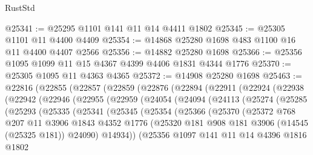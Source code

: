 \begin{lexlean}{RustStd}
\begin{coremodule}
@25341 := @25295 @1101 @141 @11 @14 @4411 @1802
@25345 := @25305 @1101 @11 @4400 @4409
@25354 := @14868 @25280 @1698 @483 @1100 @16 @11 @4400 @4407 @2566
@25356 := @14882 @25280 @1698
@25366 := @25356 @1095 @1099 @11 @15 @4367 @4399 @4406 @1831 @4344 @1776
@25370 := @25305 @1095 @11 @4363 @4365
@25372 := @14908 @25280 @1698
@25463 := @22816
    (@22855
      (@22857
        (@22859
          (@22876
            (@22894
              (@22911
                (@22924
                  (@22938
                    (@22942
                      (@22946
                        (@22955
                          (@22959
                            (@24054
                              (@24094
                                (@24113
                                  (@25274
                                    (@25285
                                      (@25293
                                        (@25335
                                          (@25341
                                            (@25345
                                              (@25354
                                                (@25366
                                                  (@25370
                                                    (@25372
                                                      @768
                                                      @207
                                                      @11
                                                      @3906
                                                      @1843
                                                      @4352
                                                      @1776
                                                      (@25320
                                                        @181
                                                        @908
                                                        @181
                                                        @3906
                                                        (@14545 (@25325 @181))
                                                        @24090)
                                                      @14934))
                                                  (@25356
                                                    @1097
                                                    @141
                                                    @11
                                                    @14
                                                    @4396
                                                    @1816
                                                    @1802

\end{coremodule}
\end{lexlean}
